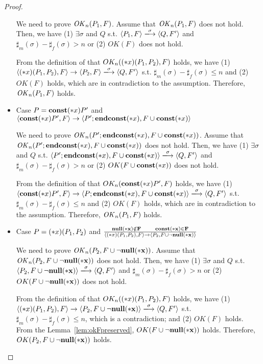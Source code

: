 \begin{proof}
\begin{itemize}
  We need to prove \(\mathit{OK}_n(P_1, F)\).  Assume that \(\mathit{OK}_n(P_1, F)\)
  does not hold. Then, we have (1) \( \exists \sigma \) and \(Q\)
  s.t. \( \langle P_1, F \rangle \xlongrightarrow{\sigma} \langle Q,
  F' \rangle \) and \(\sharp_{m}(\sigma) - \sharp_{f}(\sigma) > n\) or
  (2) \( OK(F)\) does not hold.

  From the definition of that \(OK_n((*x)(P_1, P_2), F)\) holds, we
  have (1) \( \langle \Sirx(P_1, P_2), F \rangle \rightarrow \langle
  P_2, F \rangle \xlongrightarrow{\sigma} \langle Q, F' \rangle \)
  s.t. \(\sharp_m(\sigma) - \sharp_f(\sigma) \le n \) and (2)
  \(OK(F)\) holds, which are in contradiction to the assumption.
  Therefore, \(\mathit{OK}_n(P_1, F)\) holds.


\item Case \( P = \mathbf{const}(*x) P' \) and \( \langle \mathbf{const}(*x) P', F \rangle
  \rightarrow \langle P';\mathbf{endconst}(*x), F\cup{\mathbf{const}(*x)} \rangle  \)

  We need to prove \(\mathit{OK}_n(P';\mathbf{endconst}(*x), F\cup{\mathbf{const}(*x)})\).  Assume
  that \(\mathit{OK}_n(P';\mathbf{endconst}(*x), F\cup{\mathbf{const}(*x)})\) does not hold. Then,
  we have (1) \( \exists \sigma \) and \(Q\) s.t. \( \langle
  P';\Endconst, F\cup{\scon\Sirx} \rangle \xlongrightarrow{\sigma}
  \langle Q, F' \rangle \) and \(\sharp_{m}(\sigma) -
  \sharp_{f}(\sigma) > n\) or (2) \( OK(F\cup{\mathbf{const}(*x)})\) does not
  hold.

  From the definition of that \(OK_n(\mathbf{const}(*x) P', F)\) holds, we
  have (1) \( \langle \scon\Sirx P', F \rangle \rightarrow \langle
  P;\Endconst, F\cup{\scon\Sirx} \rangle \xlongrightarrow{\sigma}
  \langle Q, F' \rangle \) s.t. \(\sharp_m(\sigma) - \sharp_f(\sigma)
  \le n \) and (2) \(OK(F)\) holds, which are in contradiction to the
  assumption.  Therefore, \(\mathit{OK}_n(P_1, F)\) holds.


\item Case \( P = (*x)(P_1,P_2) \) and \( \frac{ \bf{null}(*x) \notin F
  \quad\quad \mathbf{const}(*x) \in F} { \langle (*x)(P_1, P_2), F \rangle
  \rightarrow \langle P_2, F\cup{\neg\bf{null}(*x)} \rangle } \)

  We need to prove \(\mathit{OK}_n(P_2, F\cup{\neg\bf{null}(*x)})\).  Assume that
  \(\mathit{OK}_n(P_2, F\cup{\neg\bf{null}(*x)})\) does not hold. Then, we have (1) \(
  \exists \sigma \) and \(Q\) s.t. \( \langle P_2, F\cup{\snnull}
  \rangle \xlongrightarrow{\sigma} \langle Q, F' \rangle \) and
  \(\sharp_{m}(\sigma) - \sharp_{f}(\sigma) > n\) or (2) \(
  OK(F\cup{\neg\bf{null}(*x)})\) does not hold.

  From the definition of that \(OK_n((*x)(P_1, P_2), F)\) holds, we
  have (1) \( \langle \Sirx(P_1, P_2), F \rangle \rightarrow \langle
  P_2, F\cup{\snnull} \rangle \xlongrightarrow{\sigma} \langle Q, F'
  \rangle \) s.t. \(\sharp_m(\sigma) - \sharp_f(\sigma) \le n \),
  which is a contradiction; and (2) \(OK(F)\) holds. From the
  Lemma~\ref{lem:okFpreserved}, \(OK(F\cup{\neg\bf{null}(*x)})\)
  holds. Therefore, \(OK(P_2, F\cup{\neg\bf{null}(*x)})\) holds.


\end{itemize}
\end{proof}
